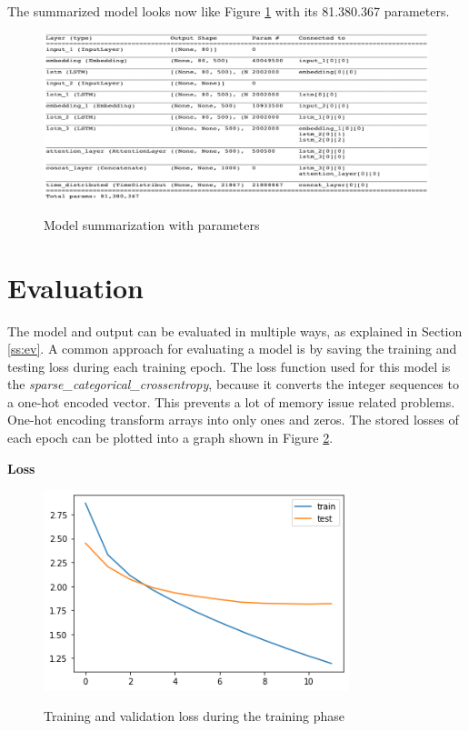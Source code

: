 The summarized model looks now like Figure \ref{model_sum} with its 81.380.367 parameters.

\begin{figure}
	\begin{center}
		\includegraphics[width=6in]{photos/model_sum}\\
		\caption{Model summarization with parameters}\label{model_sum}
	\end{center}
\end{figure}

\section{Evaluation}\label{ss:eval}

The model and output can be evaluated in multiple ways, as explained in Section \ref{ss:ev}. A common approach for evaluating a model is by saving the training and testing loss during each training epoch. The loss function used for this model is the \textit{sparse\_categorical\_crossentropy}, because it converts the integer sequences to a one-hot encoded vector. This prevents a lot of memory issue related problems. One-hot encoding transform arrays into only ones and zeros. The stored losses of each epoch can be plotted into a graph shown in Figure \ref{eval}.

\textbf{Loss}

\begin{figure}
	\begin{center}
		\includegraphics[width=3.5in]{photos/eval}\\
		\caption{Training and validation loss during the training phase}\label{eval}
	\end{center}
\end{figure}

